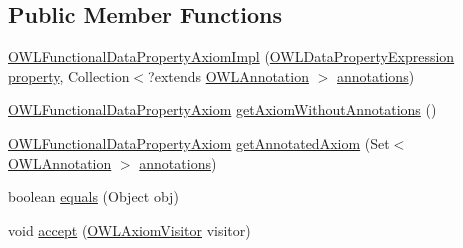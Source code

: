 \subsection*{Public Member Functions}
\begin{DoxyCompactItemize}
\item 
\hyperlink{classuk_1_1ac_1_1manchester_1_1cs_1_1owl_1_1owlapi_1_1_o_w_l_functional_data_property_axiom_impl_a535a612142b04bc40314e2aa17398a28}{O\-W\-L\-Functional\-Data\-Property\-Axiom\-Impl} (\hyperlink{interfaceorg_1_1semanticweb_1_1owlapi_1_1model_1_1_o_w_l_data_property_expression}{O\-W\-L\-Data\-Property\-Expression} \hyperlink{classuk_1_1ac_1_1manchester_1_1cs_1_1owl_1_1owlapi_1_1_o_w_l_data_property_characteristic_axiom_impl_aef4c9490bb2baa33cc38110d4d03140a}{property}, Collection$<$?extends \hyperlink{interfaceorg_1_1semanticweb_1_1owlapi_1_1model_1_1_o_w_l_annotation}{O\-W\-L\-Annotation} $>$ \hyperlink{classuk_1_1ac_1_1manchester_1_1cs_1_1owl_1_1owlapi_1_1_o_w_l_axiom_impl_af6fbf6188f7bdcdc6bef5766feed695e}{annotations})
\item 
\hyperlink{interfaceorg_1_1semanticweb_1_1owlapi_1_1model_1_1_o_w_l_functional_data_property_axiom}{O\-W\-L\-Functional\-Data\-Property\-Axiom} \hyperlink{classuk_1_1ac_1_1manchester_1_1cs_1_1owl_1_1owlapi_1_1_o_w_l_functional_data_property_axiom_impl_a54320c7c93fb49ad4920ee46be0114d8}{get\-Axiom\-Without\-Annotations} ()
\item 
\hyperlink{interfaceorg_1_1semanticweb_1_1owlapi_1_1model_1_1_o_w_l_functional_data_property_axiom}{O\-W\-L\-Functional\-Data\-Property\-Axiom} \hyperlink{classuk_1_1ac_1_1manchester_1_1cs_1_1owl_1_1owlapi_1_1_o_w_l_functional_data_property_axiom_impl_a533701d2dc0f8aeba9cc1d7980ff6d08}{get\-Annotated\-Axiom} (Set$<$ \hyperlink{interfaceorg_1_1semanticweb_1_1owlapi_1_1model_1_1_o_w_l_annotation}{O\-W\-L\-Annotation} $>$ \hyperlink{classuk_1_1ac_1_1manchester_1_1cs_1_1owl_1_1owlapi_1_1_o_w_l_axiom_impl_af6fbf6188f7bdcdc6bef5766feed695e}{annotations})
\item 
boolean \hyperlink{classuk_1_1ac_1_1manchester_1_1cs_1_1owl_1_1owlapi_1_1_o_w_l_functional_data_property_axiom_impl_a979d93334d3ae1a0acf96c0983003a73}{equals} (Object obj)
\item 
void \hyperlink{classuk_1_1ac_1_1manchester_1_1cs_1_1owl_1_1owlapi_1_1_o_w_l_functional_data_property_axiom_impl_ad2b2d19338810d7a005cb290d5f06482}{accept} (\hyperlink{interfaceorg_1_1semanticweb_1_1owlapi_1_1model_1_1_o_w_l_axiom_visitor}{O\-W\-L\-Axiom\-Visitor} visitor)
\item 

\end{DoxyCompactItemize}
